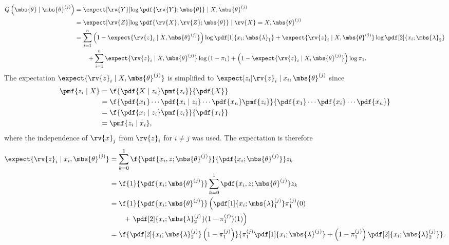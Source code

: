 \begin{align}
    Q\left(\mbs{\theta}\mid\mbs{\theta}^{(j)}\right) 
    &= \expect[\rv{Y}]{\log \pdf{\rv{Y} ; \mbs{\theta}} \mid X, \mbs{\theta}^{(j)}}\\
    &= \expect[\rv{Z}]{\log \pdf{\rv{X}, \rv{Z} ; \mbs{\theta}} \mid \rv{X}=X, \mbs{\theta}^{(j)}}\\
    &=
    \label{eq:Qtheta|thetaJ: split in params}
    \sum_{i=1}^{n} \left(1-\expect{\rv{z}_{i}\mid X, \mbs{\theta}^{(j)}}\right) \log \pdf[1]{{x}_{i}; \mbs{\lambda}_{1}} + \expect{\rv{z}_{i}\mid X, \mbs{\theta}^{(j)}}\log\pdf[2]{{x}_{i}; \mbs{\lambda}_{2}}
    \nonumber\\&\qquad
    +\sum_{i=1}^{n}\expect{\rv{z}_{i}\mid X, \mbs{\theta}^{(j)}}\log\left( 1-\pi_{1}\right) + \left(1-\expect{\rv{z}_{i}\mid X, \mbs{\theta}^{(j)}}\right)\log \pi_{1}.
\end{align}
The expectation $\expect{\rv{z}_{i} \mid X, \mbs{\theta}^{(j)}}$ is simplified to $\expect[z_{i}]{\rv{z}_{i} \mid x_{i}, \mbs{\theta}^{(j)}}$ 
since
\begin{align}
    \pmf{z_{i}\mid X} 
    &= \f{\pdf{X \mid z_{i}}\pmf{z_{i}}}{\pdf{X}}\\
    &= \f{\pdf{x_{1}}\cdots\pdf{x_{i}\mid z_{i}}\cdots \pdf{x_{n}} \pmf{z_{i}}}{\pdf{x_{1}}\cdots\pdf{x_{i}}\cdots\pdf{x_{n}}}\\
    &= \f{\pdf{x_{i}\mid z_{i}}\pmf{z_{i}}}{\pdf{x_{i}}}\\
    &= \pmf{z_{i}\mid x_{i}},
\end{align}
where the independence of $\rv{x}_{j}$ from $\rv{z}_{i}$ for $i\neq j$ was used.
The expectation is therefore
\begin{align}
    \expect{\rv{z}_{i} \mid x_{i}, \mbs{\theta}^{(j)}}
    &=
    \sum_{k=0}^{1}\f{\pdf{x_{i},z;\mbs{\theta}^{(j)}}}{\pdf{x_{i}; \mbs{\theta}^{(j)}}}z_{k}\\
    &=
    \f{1}{\pdf{x_{i}; \mbs{\theta}^{(j)}}}\sum_{k=0}^{1}\pdf{x_{i},z;\mbs{\theta}^{(j)}}z_{k}\\
    &=
    \f{1}{\pdf{x_{i}; \mbs{\theta}^{(j)}}}\left( \pdf[1]{x_{i}; \mbs{\lambda}_{1}^{(j)}}\pi_{1}^{(j)}(0)\right.\nonumber\\&\qquad + \left.\pdf[2]{x_{i}; \mbs{\lambda}_{2}^{(j)}}(1-\pi_{1}^{(j)})(1) \right)\\
    &=
    \f{
        \pdf[2]{x_{i}; \mbs{\lambda}_{2}^{(j)}}\left(1-\pi_{1}^{(j)}\right)
    }{
        \pi_{1}^{(j)}\pdf[1]{x_{i}; \mbs{\lambda}^{(j)}} + \left( 1-\pi_{1}^{(j)} \right)\pdf[2]{x_{i}; \mbs{\lambda}_{2}^{(j)}}
    }.
\end{align}
